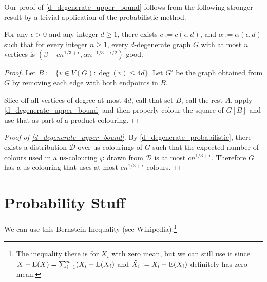 \documentclass[kpfonts]{patmorin}
\begin{document}
Our proof of \cref{d_degenerate_upper_bound} follows from the following stronger result by a trivial application of the probabilistic method.

\begin{lem}\label{d_degenerate_probabilistic}
  For any $\epsilon >0$ and any integer $d\ge 1$, there exists $c:=c(\epsilon,d)$, and $\alpha:=\alpha(\epsilon,d)$ such that for every integer $n\ge 1$, every $d$-degenerate graph $G$ with at most $n$ vertices is $(\beta+cn^{1/3+\epsilon},\alpha n^{-1/3-\epsilon/2})$-good.
\end{lem}


\begin{proof}
  Let $B:=\{v\in V(G):\deg(v)\le 4d\}$. Let $G'$ be the graph obtained from $G$ by removing each edge with both endpoints in $B$.

  Slice off all vertices of degree at most $4d$, call that set $B$, call the rest $A$, apply \cref{d_degenerate_upper_bound} and then properly colour the square of $G[B]$ and use that as part of a product colouring.
\end{proof}


\begin{proof}[Proof of \cref{d_degenerate_upper_bound}]
  By \cref{d_degenerate_probabilistic}, there exists a distribution $\mathcal{D}$ over us-colourings of $G$ such that the expected number of colours used in a us-colouring $\varphi$ drawn from $\mathcal{D}$ is at most $cn^{1/3+\epsilon}$.  Therefore $G$ has a us-colouring that uses at most $cn^{1/3+\epsilon}$ colours.
\end{proof}







\appendix

\section{Probability Stuff}

We can use this Bernstein Inequality (see Wikipedia):\footnote{The inequality there is for $X_i$ with zero mean, but we can still use it since $X-\mathrm{E}(X)=\sum_{i=1}^n (X_i-\mathrm{E}(X_i)$ and $\tilde{X}_i:=X_i-\mathrm{E}(X_i)$ definitely has zero mean.}
\end{document}

